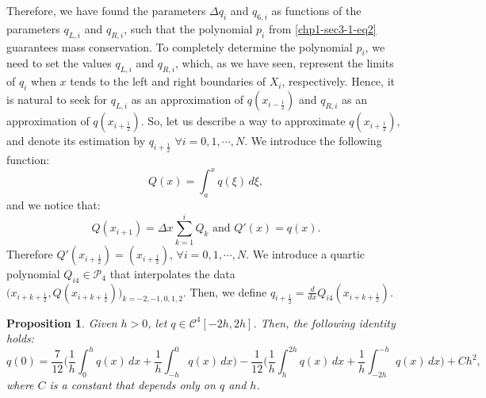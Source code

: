 Therefore, we have found the parameters $\Delta q_i$ and $q_{6, i}$ as
functions of the parameters $q_{L, i}$ and $q_{R, i}$,
such that the polynomial $p_i$ from \eqref{chp1-sec3-1-eq2} 
guarantees mass conservation. To completely determine the 
polynomial $p_i$, we need to set the values $q_{L, i}$ and
$q_{R, i}$, which, as we have seen, represent the limits of $q_i$ when
$x$ tends to the left and right boundaries of $X_i$, respectively.
Hence, it is natural to seek for $q_{L, i}$ as an approximation of $q(x_{i-\frac{1}{2}})$
and $q_{R, i}$ as an approximation of $q(x_{i+\frac{1}{2}})$.
So, let us describe a way to approximate $q(x_{i+\frac{1}{2}})$, and denote its estimation by
$q_{i+\frac{1}{2}}$ $\forall i = 0, 1, \cdots, N$.
We introduce the following function:
\begin{equation}
        \label{chp1-sec3-1-eq6}
	Q(x) = \int_{a}^{x} q(\xi) \,d\xi,
\end{equation}
and we notice that:
\begin{equation}
	Q(x_{i+1}) = \Delta x \sum_{k=1}^{i} Q_k \text{ and } Q'(x) = q(x).
\end{equation}
Therefore $Q'(x_{i+\frac{1}{2}}) = (x_{i+\frac{1}{2}}) $, $\forall i = 0, 1, \cdots, N$.
We introduce a quartic polynomial $Q_{i4} \in \mathcal{P}_4$ that interpolates the data
$\big(x_{i+k+\frac{1}{2}}, Q(x_{i+k+\frac{1}{2}})\big)_{k=-2,-1,0,1,2}$. Then, we define
$q_{i+\frac{1}{2}} = \frac{d}{dx}Q_{i4}(x_{i+k+\frac{1}{2}})$.


\theoremstyle{plain} %
\newtheorem{lema}{Lemma}[chapter]


\theoremstyle{plain} %
\newtheorem{prop}{Proposition}[chapter]

\begin{prop}
	\label{prop:bound1}
	Given $h>0$, let $q \in \mathcal{C}^{4}[-2h,2h]$. Then, the following identity
	holds:
	\begin{equation}
		\label{prop:bound1-eq1}
		q(0) = \frac{7}{12}\bigg( \frac{1}{h} \int_{0}^{h} q(x) \,dx 
		       + \frac{1}{h} \int_{-h}^{0} q(x) \,dx  \bigg)
		       - \frac{1}{12}\bigg( \frac{1}{h} \int_{h}^{2h} q(x) \,dx 
		       + \frac{1}{h} \int_{-2h}^{-h} q(x) \,dx  \bigg) + Ch^2,
	\end{equation}
	where $C$ is a constant that depends only on $q$ and $h$.
\end{prop}

